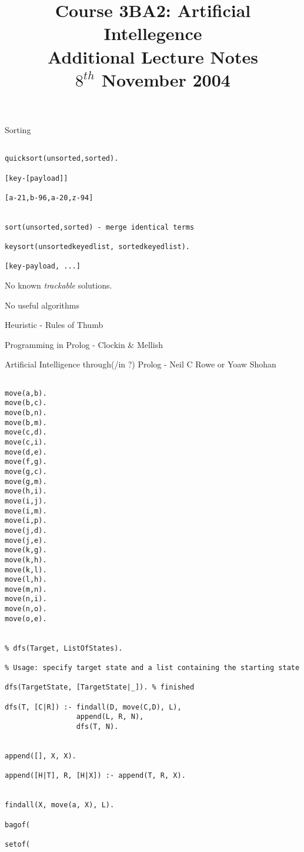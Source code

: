 \documentclass[a4paper,12pt]{article}
\begin{document}
\title{Course 3BA2: Artificial Intellegence \\ Additional Lecture Notes \\ $8^{th}$ November 2004}

\maketitle

Sorting

\begin{verbatim}

quicksort(unsorted,sorted).

[key-[payload]]

[a-21,b-96,a-20,z-94]


sort(unsorted,sorted) - merge identical terms

keysort(unsortedkeyedlist, sortedkeyedlist).

[key-payload, ...]

\end{verbatim}

No known \emph{trackable} solutions.

No useful algorithms


Heuristic - Rules of Thumb


Programming in Prolog - Clockin \& Mellish


Artificial Intelligence through(/in ?) Prolog - Neil C Rowe or Yoaw
Shohan

\begin{verbatim}

move(a,b).
move(b,c).
move(b,n).
move(b,m).
move(c,d).
move(c,i).
move(d,e).
move(f,g).
move(g,c).
move(g,m).
move(h,i).
move(i,j).
move(i,m).
move(i,p).
move(j,d).
move(j,e).
move(k,g).
move(k,h).
move(k,l).
move(l,h).
move(m,n).
move(n,i).
move(n,o).
move(o,e).


% dfs(Target, ListOfStates).

% Usage: specify target state and a list containing the starting state

dfs(TargetState, [TargetState|_]). % finished

dfs(T, [C|R]) :- findall(D, move(C,D), L),
                 append(L, R, N),
                 dfs(T, N).


append([], X, X).

append([H|T], R, [H|X]) :- append(T, R, X). 


findall(X, move(a, X), L).

bagof(

setof(

\end{verbatim}
\end{document}

